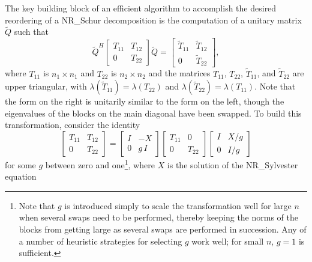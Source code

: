 The key building block of an efficient algorithm to accomplish the desired reordering of a NR_Schur decomposition is the computation of a unitary matrix $\tilde Q$ such that
\begin{equation}
  \tilde Q^H \begin{bmatrix} T_{11} & T_{12} \\  0 & T_{22} \end{bmatrix} \tilde Q = \begin{bmatrix} \tilde T_{11} & \tilde T_{12} \\  0 & \tilde T_{22} \end{bmatrix},
  \label{blockswap}
\end{equation}
where $T_{11}$ is $n_1 \times n_1$ and $T_{22}$ is $n_2 \times n_2$ and the matrices $T_{11}$, $T_{22}$, $\tilde T_{11}$, and $\tilde T_{22}$ are upper triangular,
with $\lambda(\tilde T_{11})=\lambda(T_{22})$ and $\lambda(\tilde T_{22})=\lambda(T_{11})$.  
Note that the form on the right is unitarily similar to the form on
the left, though the eigenvalues of the blocks on the main diagonal have been swapped.
To build this transformation, consider the identity
\begin{equation}
  \begin{bmatrix} T_{11} & T_{12} \\ 0 & T_{22} \end{bmatrix} =
  \begin{bmatrix} I & -X \\ 0 & g\, I \end{bmatrix} \begin{bmatrix} T_{11} & 0 \\ 0 & T_{22} \end{bmatrix} \begin{bmatrix} I & X/g \\ 0 & I/g \end{bmatrix}
    \label{blockswap2}  
\end{equation}
for some $g$ between zero and one\footnote{Note that $g$ is introduced simply to scale the transformation well for large $n$ when several swaps need
to be performed, thereby keeping the norms
of the blocks from getting large as several swaps are performed in succession.  Any of a number of heuristic strategies for selecting $g$ work well;
for small $n$, $g=1$ is sufficient.}, where $X$ is the solution of the NR_Sylvester equation

